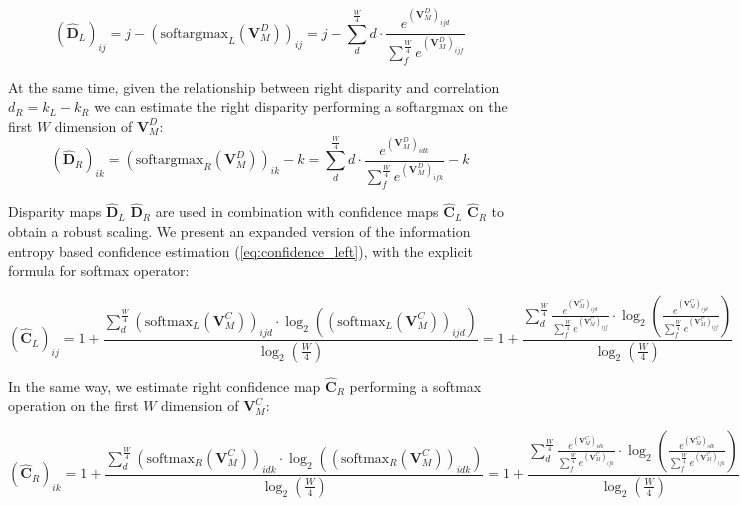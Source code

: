 \small\begin{equation} 
    (\hat{\mathbf{D}}_L)_{ij} = j - \left(\text{softargmax}_L (\mathbf{V}^D_M )\right)_{ij} = j - \sum_{d}^{\frac{W}{4}} d \cdot \frac{e^{(\mathbf{V}^D_M)_{ijd}}}{\sum_{f}^{\frac{W}{4}} e^{(\mathbf{V}^D_M)_{ijf}}}
    \label{eq:softmax_left2}
\end{equation}\normalsize

At the same time, given the relationship between right disparity and correlation $d_R=k_L-k_R$ we can estimate the right disparity performing a softargmax on the first $W$ dimension of $\mathbf{V}^D_M$:
\small\begin{equation}
    (\hat{\mathbf{D}}_R)_{ik} = \left(\text{softargmax}_R(\mathbf{V}^D_M)\right)_{ik} - k = \sum_{d}^{\frac{W}{4}} d \cdot \frac{e^{(\mathbf{V}^D_M)_{idk}}}{\sum_{f}^{\frac{W}{4}} e^{(\mathbf{V}^D_M)_{ifk}}} - k
    \label{eq:softmax_right}
\end{equation}\normalsize

Disparity maps $\hat{\mathbf{D}}_L$ $\hat{\mathbf{D}}_R$ are used in combination with confidence maps $\hat{\mathbf{C}}_L$ $\hat{\mathbf{C}}_R$ to obtain a robust scaling.
We present an expanded version of the information entropy based confidence estimation (\cref{eq:confidence_left}), with the explicit formula for softmax operator:

\small\begin{equation}
    (\hat{\mathbf{C}}_L)_{ij} = 1  + \frac{\sum_{d}^{\frac{W}{4}} \left(\text{softmax}_L(\mathbf{V}_M^C)\right)_{ijd} \cdot \log_2 \left( \left(\text{softmax}_L(\mathbf{V}_M^C)\right)_{ijd} \right)}{\log_2(\frac{W}{4})} = 1  + \frac{\sum_{d}^{\frac{W}{4}} \frac{e^{(\mathbf{V}^C_M)_{ijd}}}{\sum_{f}^{\frac{W}{4}} e^{(\mathbf{V}^C_M)_{ijf}}} \cdot \log_2 \left( \frac{e^{(\mathbf{V}^C_M)_{ijd}}}{\sum_{f}^{\frac{W}{4}} e^{(\mathbf{V}^C_M)_{ijf}}} \right)}{\log_2(\frac{W}{4})}
    \label{eq:confidence_left2}
\end{equation}\normalsize

In the same way, we estimate right confidence map $\hat{\mathbf{C}}_R$ performing a softmax operation on the first $W$ dimension of $\mathbf{V}^C_M$:

\small\begin{equation}
    (\hat{\mathbf{C}}_R)_{ik} = 1  + \frac{\sum_{d}^{\frac{W}{4}} \left(\text{softmax}_R(\mathbf{V}_M^C)\right)_{idk} \cdot \log_2 \left( \left(\text{softmax}_R(\mathbf{V}_M^C)\right)_{idk} \right)}{\log_2(\frac{W}{4})} = 1 + \frac{\sum_{d}^{\frac{W}{4}} \frac{e^{(\mathbf{V}^C_M)_{idk}}}{\sum_{f}^{\frac{W}{4}} e^{(\mathbf{V}^C_M)_{ifk}}} \cdot \log_2 \left( \frac{e^{(\mathbf{V}^C_M)_{idk}}}{\sum_{f}^{\frac{W}{4}} e^{(\mathbf{V}^C_M)_{ifk}}} \right)}{\log_2(\frac{W}{4})}
    \label{eq:confidence_right}
\end{equation}\normalsize


